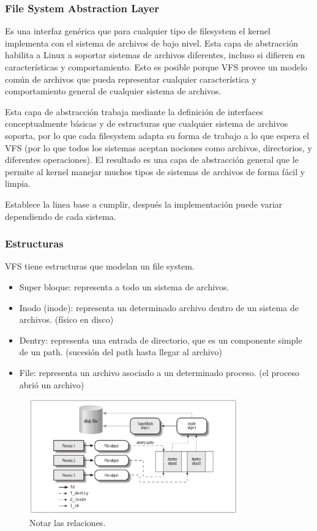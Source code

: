 \documentclass[titlepage,a4paper]{article}
\begin{document}
\subsubsection*{File System Abstraction Layer}
Es una interfaz genérica que para cualquier tipo de filesystem el kernel implementa con el sistema de archivos de bajo nivel. Esta capa de abstracción habilita a Linux a soportar sistemas de archivos diferentes, incluso si difieren en características y comportamiento. Esto es posible porque VFS provee un modelo común de archivos que pueda representar cualquier característica y comportamiento general de cualquier sistema de archivos.

Esta capa de abstracción trabaja mediante la definición de interfaces conceptualmente básicas y de estructuras que cualquier sistema de archivos soporta, por lo que cada filesystem adapta su forma de trabajo a lo que espera el VFS (por lo que todos los sistemas aceptan nociones como archivos, directorios, y diferentes operaciones). El resultado es una capa de abstracción general que le permite al kernel manejar muchos tipos de sistemas de archivos de forma fácil y limpia.

Establece la linea base a cumplir, después la implementación puede variar dependiendo de cada sistema.

\subsubsection*{Estructuras}
VFS tiene estructuras que modelan un file system.
\begin{itemize}
    \item Super bloque: representa a todo un sistema de archivos.
    \item Inodo (inode): representa un determinado archivo dentro de un sistema de archivos. (físico en disco)
    \item Dentry: representa una entrada de directorio, que es un componente simple de un path. (sucesión del path hasta llegar al archivo)
    \item File: representa un archivo asociado a un determinado proceso. (el proceso abrió un archivo)
\end{itemize}

\begin{figure}[!htb]
    \centering
    \includegraphics[width=0.8\textwidth]{ImagenesApunte/vfs_components.png}
    \caption{Notar las relaciones.}
\end{figure}
\end{document}
